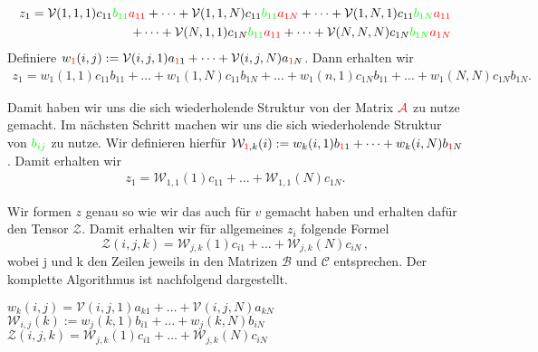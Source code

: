 \begin{equation*} \label{eq:zold}
\begin{aligned}
z_{1} = \mathcal{V}(1,1,1) c_{11} \textcolor{green}{b_{11}} \textcolor{red}{a_{11}}+ \dots +  \mathcal{V}(1,1,N) c_{11} \textcolor{green}{b_{11}} \textcolor{red}{a_{1N}} + \dots  +  \mathcal{V}(1,N,1)c_{11} 
\textcolor{green}{b_{1N}} \textcolor{red}{a_{11}} \\ + \dots +  \mathcal{V}(N,1,1) c_{1N} \textcolor{green}{b_{11}} \textcolor{red}{a_{11}} + \dots +  \mathcal{V}(N,N,N) c_{1N} \textcolor{green}{b_{1N}} \textcolor{red}{a_{1N}}
\end{aligned}
\end{equation*}
Definiere $w_{\textcolor{red}{1}}(i,j) :=\mathcal{V}(i,j,1) a_{\textcolor{red}{1}1}+\dots+\mathcal{V}(i,j,N) a_{\textcolor{red}{1}N}$. Dann erhalten wir
\begin{equation*}
\begin{aligned}
z_{1}= w_1(1,1) c_{11} b_{11} + \dots +   w_1(1,N) c_{11} b_{1N} + \dots + w_1(n,1) c_{1N} b_{11}  + \dots +  w_1(N,N) c_{1N} b_{1N}.
\end{aligned}
\end{equation*}

Damit haben wir uns die sich wiederholende Struktur von der Matrix $\textcolor{red}{\mathcal{A}}$ zu nutze gemacht. Im nächsten Schritt machen wir uns die sich wiederholende Struktur von $\textcolor{green}{b_{ij}}$ zu nutze.
Wir definieren hierfür $\mathcal{W}_{\textcolor{red}{1},k} (i):= w_k(i,1) b_{\textcolor{red}{1}1} + \dots + w_k(i,N) b_{\textcolor{red}{1}N}$. Damit erhalten wir
\begin{equation} \label{eq:znew}
\begin{aligned}
z_{1}= \mathcal{W}_{1,1}(1) c_{11}  + \dots +  \mathcal{W}_{1,1}(N) c_{1N}.
\end{aligned}
\end{equation}

Wir formen $z$ genau so wie wir das auch für $v$ gemacht haben und erhalten dafür den Tensor $\mathcal{Z}$. Damit erhalten wir für allgemeines $z_{i}$ folgende Formel
\begin{equation}
\mathcal{Z}(i,j,k) = \mathcal{W}_{j,k}(1) c_{i1}  + \dots +  \mathcal{W}_{j,k}(N) c_{iN} \, ,
\end{equation}
wobei j und k den Zeilen jeweils in den Matrizen $\mathcal{B}$ und $\mathcal{C}$ entsprechen. 
\newpage
Der komplette Algorithmus ist nachfolgend dargestellt.
\begin{mdframed}[backgroundcolor=blue!3] 
\begin{algorithmic}
			\State $w_{k}(i,j) = \mathcal{V}(i,j,1)a_{k1} + \dots + \mathcal{V}(i,j,N)a_{kN}$
		\EndFor
	\EndFor
\EndFor
{}
			\State $\mathcal{W}_{i,j} (k):= w_j(k,1) b_{i1} + \dots + w_j(k,N) b_{iN}$
		\EndFor
	\EndFor
\EndFor
{}
			\State $\mathcal{Z}(i,j,k) = \mathcal{W}_{j,k}(1) c_{i1}  + \dots +  \mathcal{W}_{j,k}(N) c_{iN}$ 
		\EndFor
	\EndFor
\EndFor
\end{algorithmic}
\end{mdframed}


